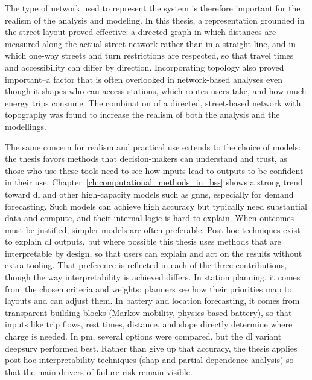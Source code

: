 The type of network used to represent the system is therefore important for the realism of the analysis and modeling. In this thesis, a representation grounded in the street layout proved effective: a directed graph in which distances are measured along the actual street network rather than in a straight line, and in which one-way streets and turn restrictions are respected, so that travel times and accessibility can differ by direction. Incorporating topology also proved important--a factor that is often overlooked in network-based analyses even though it shapes who can access stations, which routes users take, and how much energy trips consume. The combination of a directed, street-based network with topography was found to increase the realism of both the analysis and the modellings. 

The same concern for realism and practical use extends to the choice of models: the thesis favors methods that decision-makers can understand and trust, as those who use these tools need to see how inputs lead to outputs to be confident in their use. Chapter~\ref{ch:computational_methods_in_bss} shows a strong trend toward \ac{dl} and other high-capacity models such as \acp{gnn}, especially for demand forecasting. Such models can achieve high accuracy but typically need substantial data and compute, and their internal logic is hard to explain. When outcomes must be justified, simpler models are often preferable. Post-hoc techniques exist to explain \ac{dl} outputs, but where possible this thesis uses methods that are interpretable by design, so that users can explain and act on the results without extra tooling. That preference is reflected in each of the three contributions, though the way interpretability is achieved differs. In station planning, it comes from the chosen criteria and weights: planners see how their priorities map to layouts and can adjust them. In battery and location forecasting, it comes from transparent building blocks (Markov mobility, physics-based battery), so that inputs like trip flows, rest times, distance, and slope directly determine where charge is needed. In \ac{pm}, several options were compared, but the \ac{dl} variant \ac{deepsurv} performed best. Rather than give up that accuracy, the thesis applies post-hoc interpretability techniques (\ac{shap} and partial dependence analysis) so that the main drivers of failure risk remain visible.

